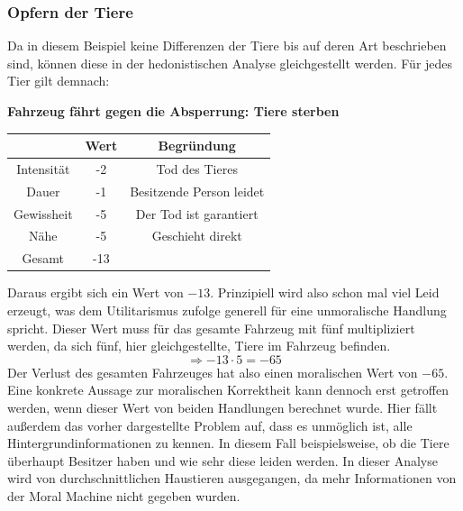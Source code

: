 \documentclass[a4paper, 12pt, openany]{book}
\begin{document}
                \subsubsection*{Opfern der Tiere}
                    Da in diesem Beispiel keine Differenzen der Tiere bis auf deren Art beschrieben sind, können diese in der hedonistischen Analyse gleichgestellt werden. Für jedes Tier gilt demnach:
                    \begin{center}
                        \textbf{Fahrzeug fährt gegen die Absperrung: Tiere sterben}
                    \end{center}
                    \begin{center}
                        \begin{tabular}{|c|c|c|}
                            \hline
                            & Wert & Begründung \\
                            \hline
                            Intensität & -2 & Tod des Tieres \\
                            Dauer & -1 & Besitzende Person leidet \\
                            Gewissheit & -5 & Der Tod ist garantiert \\
                            Nähe & -5 & Geschieht direkt \\
                            \hline
                            Gesamt & -13 & \\
                            \hline
                        \end{tabular}
                    \end{center}\par
                    \vspace{.3cm}
                    Daraus ergibt sich ein Wert von $-13$. Prinzipiell wird also schon mal viel Leid erzeugt, was dem Utilitarismus zufolge generell für eine unmoralische Handlung spricht. Dieser Wert muss für das gesamte Fahrzeug mit fünf multipliziert werden, da sich fünf, hier gleichgestellte, Tiere im Fahrzeug befinden.
                    $$\Rightarrow -13 \cdot 5 = -65$$
                    Der Verlust des gesamten Fahrzeuges hat also einen moralischen Wert von $-65$. Eine konkrete Aussage zur moralischen Korrektheit kann dennoch erst getroffen werden, wenn dieser Wert von beiden Handlungen berechnet wurde. Hier fällt außerdem das vorher dargestellte Problem auf, dass es unmöglich ist, alle Hintergrundinformationen zu kennen. In diesem Fall beispielsweise, ob die Tiere überhaupt Besitzer haben und wie sehr diese leiden werden. In dieser Analyse wird von durchschnittlichen Haustieren ausgegangen, da mehr Informationen von der Moral Machine nicht gegeben wurden.
                
\end{document}
